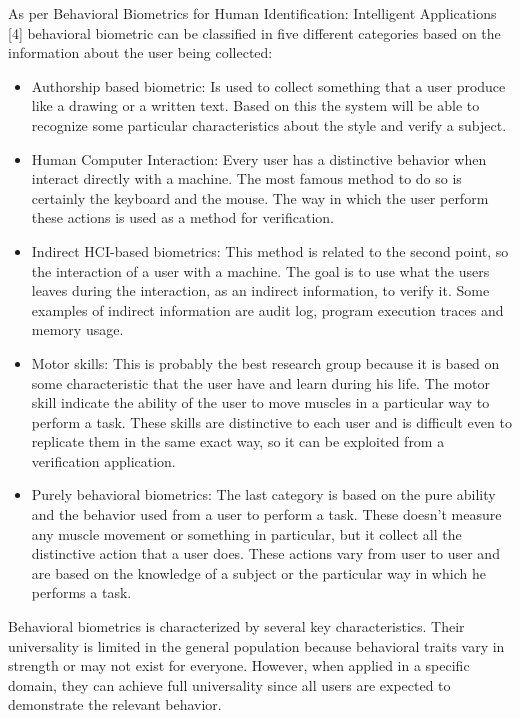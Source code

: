 \documentclass[12pt]{report}
\begin{document}
As per Behavioral Biometrics for Human Identification: Intelligent Applications [4] behavioral biometric can be classified in five different categories based on the information about the user being collected:
\begin{itemize}
    \item Authorship based biometric: Is used to collect something that a user produce like a drawing or a written text. 
    Based on this the system will be able to recognize some particular characteristics about the style and verify a subject.
    \item Human Computer Interaction: Every user has a distinctive behavior when interact directly with a machine. 
    The most famous method to do so is certainly the keyboard and the mouse. 
    The way in which the user perform these actions is used as a method for verification.
    \item Indirect HCI-based biometrics: This method is related to the second point, so the interaction of a user with a machine.
    The goal is to use what the users leaves during the interaction, as an indirect information, to verify it. 
    Some examples of indirect information are audit log, program execution traces and memory usage.
    \item Motor skills: This is probably the best research group because it is based on some characteristic that the user have and learn during his life.
    The motor skill indicate the ability of the user to move muscles in a particular way to perform a task.
    These skills are distinctive to each user and is difficult even to replicate them in the same exact way, so it can be exploited from a verification application.
    \item Purely behavioral biometrics: The last category is based on the pure ability and the behavior used from a user to perform a task. 
    These doesn't measure any muscle movement or something in particular, but it collect all the distinctive action that a user does.
    These actions vary from user to user and are based on the knowledge of a subject or the particular way in which he performs a task.
\end{itemize}

Behavioral biometrics is characterized by several key characteristics. 
Their universality is limited in the general population because behavioral traits vary in strength or may not exist for everyone. 
However, when applied in a specific domain, they can achieve full universality since all users are expected to demonstrate the relevant behavior.
\end{document}
